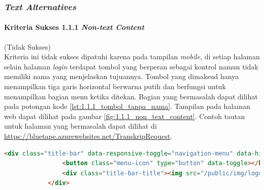 \documentclass[a4paper,twoside]{article}
\begin{document}
\begin{enumerate}
		\subsubsection*{\textit{Text Alternatives}}
		\label{subsubsec:kepatuhan_bluetape_text_alternatives}

		\paragraph{Kriteria Sukses 1.1.1 \textit{Non-text Content}}
		\label{par:kepatuhan_bluetape_kriteria_sukses_1.1.1}
		(Tidak Sukses)\\

		Kriteria ini tidak sukses dipatuhi karena pada tampilan \textit{mobile}, di setiap halaman selain halaman \textit{login} terdapat tombol yang berperan sebagai kontrol namun tidak memiliki nama yang menjelaskan tujuannya. Tombol yang dimaksud hanya menampilkan tiga garis horizontal berwarna putih dan berfungsi untuk menampilkan bagian menu ketika ditekan. Bagian yang bermasalah dapat dilihat pada potongan kode \ref{lst:1.1.1_tombol_tanpa_nama}. Tampilan pada halaman web dapat dilihat pada gambar \ref{fig:1.1.1_non_text_content}. Contoh tautan untuk halaman yang bermasalah dapat dilihat di \url{https://bluetape.azurewebsites.net/TranskripRequest}.

		\begin{lstlisting}[frame=single, label={lst:1.1.1_tombol_tanpa_nama}, language=HTML, caption=Kriteria Sukses 1.1.1 - Tombol Tanpa Nama]
			<div class="title-bar" data-responsive-toggle="navigation-menu" data-hide-for="medium">
				<button class="menu-icon" type="button" data-toggle></button>
				<div class="title-bar-title"><img src="/public/img/logo.png" class="textsized" alt="B"/></div>
			</div>
		\end{lstlisting}


\end{enumerate}
\end{document}
